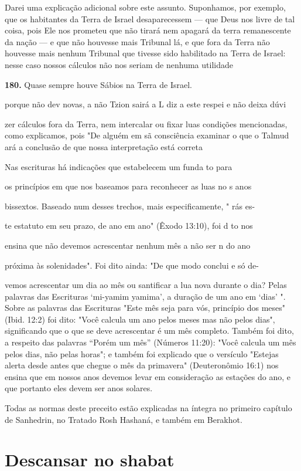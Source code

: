 Darei uma explicação adicional sobre este assunto. Suponhamos, por
exemplo, que os habitantes da Terra de Israel desaparecessem --- que
Deus nos livre de tal coisa, pois Ele nos prometeu que não tirará nem
apagará da terra
 remanescente da nação --- e que não houvesse mais Tribunal lá, e que
 fora da Terra não houvesse mais nenhum Tribunal que tivesse sido
 habilitado na Terra de Israel: nesse caso nossos cálculos não nos
 seriam de nenhuma utilidade


\textbf{180.} Quase sempre houve Sábios na Terra de Israel.


porque não dev novas, a não Tzion sairá a L diz a este respei e não
deixa dúvi

zer cálculos fora da Terra, nem intercalar ou fixar luas condições
mencionadas, como explicamos, pois "De alguém em sã consciência examinar
o que o Talmud ará a conclusão de que nossa interpretação está correta


Nas escrituras há indicações que estabelecem um funda to para

os princípios em que nos baseamos para reconhecer as luas no s anos

bissextos. Baseado num desses trechos, mais especificamente, " rás es-

te estatuto em seu prazo, de ano em ano" (Êxodo 13:10), foi d to nos

ensina que não devemos acrescentar nenhum mês a não ser n do ano

próxima às solenidades". Foi dito ainda: "De que modo conclui e só de-

vemos acrescentar um dia ao mês ou santificar a lua nova durante o dia?
Pelas palavras das Escrituras `mi-yamim yamima', a duração de um ano em
`dias' ". Sobre as palavras das Escrituras "Este mês seja para vós,
princípio dos meses" (Ibid. 12:2) foi dito: "Você calcula um ano pelos
meses mas não pelos dias", significando que o que se deve acrescentar é
um mês completo. Também foi dito, a respeito das palavras ``Porém um mês''
(Números 11:20): "Você calcula um mês pelos dias, não pelas horas"; e
também foi explicado que o versículo "Estejas alerta desde antes que
chegue o mês da primavera" (Deuteronômio 16:1) nos ensina que em nossos
anos devemos levar em consideração as esta­ções do ano, e que portanto
eles devem ser anos solares.

Todas as normas deste preceito estão explicadas na íntegra no pri­meiro
capítulo de Sanhedrin, no Tratado Rosh Hashaná, e também em Berakhot.

\section{Descansar no shabat}

